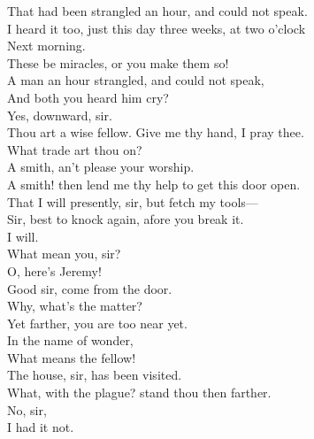 \documentclass[a4paper,oneside]{memoir}
\begin{document}
\begin{drama*}
That had been strangled an hour, and could not speak.\\
\neightwospeaks I heard it too, just this day three weeks, at two o'clock\\
Next morning.\\
\lovewitspeaks {} These be miracles, or you make them so!\\
A man an hour strangled, and could not speak,\\
And both you heard him cry?\\
\neighthreespeaks {} Yes, downward, sir.\\
\lovewitspeaks Thou art a wise fellow. Give me thy hand, I pray thee.\\
What trade art thou on?\\
\neighthreespeaks {} A smith, an't please your worship.\\
\lovewitspeaks A smith! then lend me thy help to get this door open.\\
\neighthreespeaks That I will presently, sir, but fetch my tools---\\
\neighonespeaks Sir, best to knock again, afore you break it.\\
\lovewitspeaks {} I will.\\
\facespeaks {} What mean you, sir?\\
\neighonespeaks
\neightwospeaks
\neighfourspeaks {}  O, here's Jeremy!\\
\facespeaks Good sir, come from the door.\\
\lovewitspeaks {} Why, what's the matter?\\
\facespeaks Yet farther, you are too near yet.\\
\lovewitspeaks {} In the name of wonder,\\
What means the fellow!\\
\facespeaks {} The house, sir, has been visited.\\
\lovewitspeaks What, with the plague? stand thou then farther.\\
\facespeaks {} No, sir,\\
I had it not.\\

\end{drama*}
\end{document}
